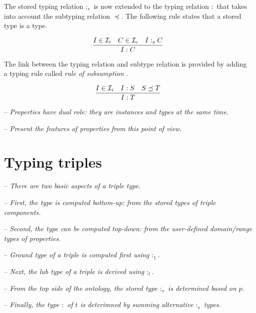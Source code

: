 \documentclass[runningheads]{llncs}
\newcommand{\Ii}{{\cal I}_i}
\newcommand{\Ic}{{\cal I}_c}
\newcommand{\memo}[1]{}
\newcommand{\notes}[1]{\noindent\begin{small}-- \emph{#1}\\\end{small}}
\begin{document}
The stored typing relation $:_s$ is now extended to the typing
relation $:$ that takes into account the subtyping relation $\preceq$.
The following rule states that a stored type is a type.

\begin{equation}
\dfrac{I\in\Ii \quad C\in\Ic \quad I:_s\/C}
      {I:C}
\end{equation}

The link between the typing relation and subtype relation is provided
by adding a typing rule called \emph{rule of subsumption}
\cite{Pierce02TypesProgLang}.

\begin{equation}
\dfrac{I\in\Ii \quad I:S \quad S\preceq\/T}
      {I:T}    
\end{equation}


\notes{Properties have dual role: they are instances and types at the same time.}
\notes{Present the features of properties from this point of view.}

\memo{Put together the base types of ground identifiers using $\land$ type.}
\memo{First, the base type of an ground identifier is the $\land$ of all base types.}
\memo{The \emph{base type} of a ground identifier is defined explicitely!}

\memo{The lub types of base types B are the smallest types related to all base types.}
\memo{The lub types are related by $\land$ to form a (complete) type of a ground identifier.}
\memo{The complete type of a ground identifier is defined explicitely.}








\section{Typing triples}

\notes{There are two basic aspects of a triple type.}
\notes{First, the type is computed bottom-up: from the stored types of triple components.}
\notes{Second, the type can be computed top-down: from the user-defined domain/range types of properties.}

\notes{Ground type of a triple is computed first using $:_1$.}
\notes{Next, the lub type of a triple is derived using $:_l$.}
\notes{From the top side of the ontology, the stored type $:_s$ is determined based on $p$.}
\notes{Finally, the type $:$ of $t$ is deterimned by summing alternative $:_s$ types.}
\end{document}

